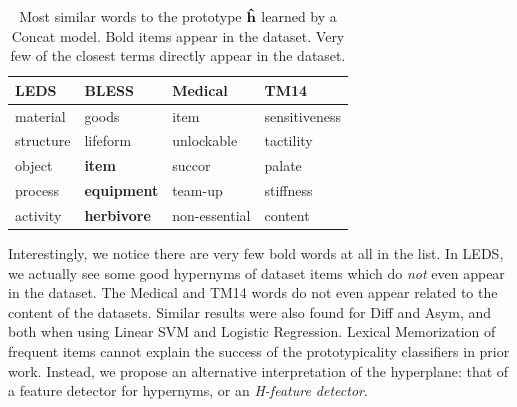 \begin{table}[t]
\begin{center}
  \begin{tabular}{|llll|}
    \hline
    {\bf LEDS} & {\bf BLESS} & {\bf Medical} & {\bf TM14}\\
    \hline
     material       &      goods             &     item           &      sensitiveness          \\
     structure      &      lifeform          &     unlockable     &      tactility              \\
     object         & {\bf item}             &     succor         &      palate                 \\
     process        & {\bf equipment}        &     team-up        &      stiffness              \\
     activity       & {\bf herbivore}        &     non-essential  &      content                \\
    \hline
  \end{tabular}
\end{center}
\caption{Most similar words to the prototype ${\mathbf{\hat h}}$ learned by a Concat model. Bold items
appear in the dataset. Very few of the closest terms directly appear in the dataset.}
\label{tab:wordsim}
\end{table}

Interestingly, we notice there are very few bold words at all in the list.  In
LEDS, we actually see some good hypernyms of dataset items which do {\em not}
even appear in the dataset. The Medical and TM14 words do not even appear
related to the content of the datasets. Similar results were also found for
Diff and Asym, and both when using Linear SVM and Logistic Regression. Lexical
Memorization of frequent items cannot explain the success of the prototypicality
classifiers in prior work. Instead, we propose an alternative interpretation of
the hyperplane: that of a feature detector for hypernyms, or an {\em H-feature
detector}.

